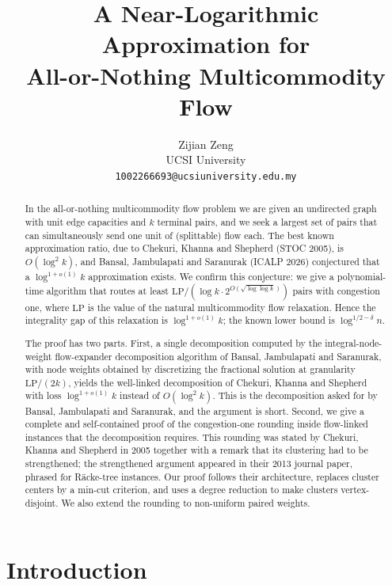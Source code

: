 \documentclass[11pt,letterpaper]{article}
\title{A Near-Logarithmic Approximation for\\ All-or-Nothing Multicommodity Flow}
\author{Zijian Zeng\\ UCSI University\\ \texttt{1002266693@ucsiuniversity.edu.my}}
\date{}
\theoremstyle{definition}
\newcommand{\LP}{\mathrm{LP}}
\begin{document}
\maketitle

\begin{abstract}
In the all-or-nothing multicommodity flow problem we are given an undirected graph with unit
edge capacities and $k$ terminal pairs, and we seek a largest set of pairs that can
simultaneously send one unit of (splittable) flow each. The best known approximation ratio,
due to Chekuri, Khanna and Shepherd (STOC 2005), is $O(\log^2 k)$, and Bansal, Jambulapati and
Saranurak (ICALP 2026) conjectured that a $\log^{1+o(1)} k$ approximation exists. We confirm
this conjecture: we give a polynomial-time algorithm that routes at least
$\LP/(\log k\cdot 2^{O(\sqrt{\log\log k})})$ pairs with congestion one, where $\LP$ is the value
of the natural multicommodity flow relaxation. Hence the integrality gap of this relaxation is
$\log^{1+o(1)}k$; the known lower bound is $\log^{1/2-\delta}n$.

The proof has two parts. First, a single decomposition computed by the integral-node-weight
flow-expander decomposition algorithm of Bansal, Jambulapati and Saranurak, with node weights obtained
by discretizing the fractional solution at granularity $\LP/(2k)$, yields the well-linked
decomposition of Chekuri, Khanna and Shepherd with loss $\log^{1+o(1)}k$ instead of
$O(\log^2k)$. This is the decomposition asked for by Bansal, Jambulapati and Saranurak, and
the argument is short. Second, we give a complete and self-contained proof of the
congestion-one rounding inside flow-linked instances that the decomposition requires. This
rounding was stated by Chekuri, Khanna and Shepherd in 2005 together with a remark that its
clustering had to be strengthened; the strengthened argument appeared in their 2013 journal
paper, phrased for R\"acke-tree instances. Our proof follows their architecture, replaces
cluster centers by a min-cut criterion, and uses a degree reduction to make clusters
vertex-disjoint. We also extend the rounding to non-uniform paired weights.
\end{abstract}

\section{Introduction}
\end{document}
